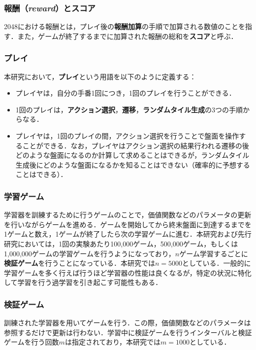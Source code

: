 \documentclass{suribt}
\begin{document}
\subsubsection{報酬（\textit{reward}）とスコア}
2048における報酬とは，プレイ後の\textbf{報酬加算}の手順で加算される数値のことを指す．また，ゲームが終了するまでに加算された報酬の総和を\textbf{スコア}と呼ぶ．

\subsubsection{プレイ}
本研究において，\textbf{プレイ}という用語を以下のように定義する：
\begin{itemize}
\item プレイヤは，自分の手番1回につき，1回のプレイを行うことができる．
\item 1回のプレイは，\textbf{アクション選択}，\textbf{遷移}，\textbf{ランダムタイル生成}の3つの手順からなる．
\item プレイヤは，1回のプレイの間，アクション選択を行うことで盤面を操作することができる．なお，プレイヤはアクション選択の結果行われる遷移の後どのような盤面になるのか計算して求めることはできるが，ランダムタイル生成後にどのような盤面になるかを知ることはできない（確率的に予想することはできる）．
\end{itemize}

\subsubsection{学習ゲーム}
学習器を訓練するために行うゲームのことで，価値関数などのパラメータの更新を行いながらゲームを進める．ゲームを開始してから終末盤面に到達するまでを1ゲームと数え，1ゲームが終了したら次の学習ゲームに進む．本研究および先行研究においては，1回の実験あたり100,000ゲーム，500,000ゲーム，もしくは1,000,000ゲームの学習ゲームを行うようになっており，$n$ゲーム学習するごとに\textbf{検証ゲーム}を行うことになっている．本研究では$n=5000$としている．一般的に学習ゲームを多く行えば行うほど学習器の性能は良くなるが，特定の状況に特化して学習を行う過学習を引き起こす可能性もある．\cite{Yeh}

\subsubsection{検証ゲーム}
訓練された学習器を用いてゲームを行う．この際，価値関数などのパラメータは参照するだけで更新は行わない．学習中に検証ゲームを行うインターバルと検証ゲームを行う回数$m$は指定されており，本研究では$m=1000$としている．
\end{document}
